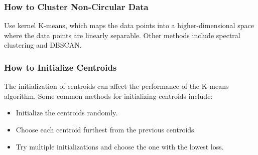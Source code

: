 \documentclass[a4paper,12pt]{article}
\begin{document}
\subsubsection{How to Cluster Non-Circular Data}

Use kernel K-means, which maps the data points into a higher-dimensional space where the data points are linearly separable. Other methods include spectral clustering and DBSCAN.

\subsubsection{How to Initialize Centroids}

The initialization of centroids can affect the performance of the K-means algorithm. Some common methods for initializing centroids include:
\begin{itemize}
  \item Initialize the centroids randomly.
  \item Choose each centroid furthest from the previous centroids.
  \item Try multiple initializations and choose the one with the lowest loss.
\end{itemize}
\end{document}
